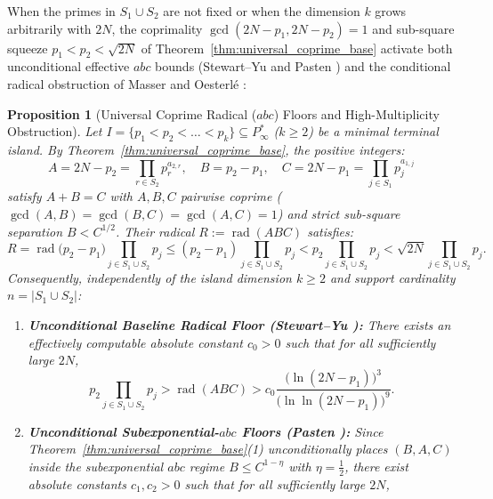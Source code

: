 \documentclass[11pt,a4paper]{article}
\newtheorem{proposition}[theorem]{Proposition}
\theoremstyle{definition}
\begin{document}
When the primes in $S_1 \cup S_2$ are not fixed or when the dimension $k$ grows arbitrarily with $2N$, the coprimality $\gcd(2N - p_1, 2N - p_2) = 1$ and sub-square squeeze $p_1 < p_2 < \sqrt{2N}$ of Theorem~\ref{thm:universal_coprime_base} activate both unconditional effective $abc$ bounds (Stewart--Yu \cite{stewartyu2001} and Pasten \cite{pasten2024}) and the conditional radical obstruction of Masser and Oesterl\'e \cite{masser1985, oesterle1988}:

\begin{proposition}[Universal Coprime Radical ($abc$) Floors and High-Multiplicity Obstruction]
\label{prop:abc_universal_collapse}
Let $I = \{p_1 < p_2 < \dots < p_k\} \subseteq P^*_\infty$ ($k \ge 2$) be a minimal terminal island. By Theorem~\ref{thm:universal_coprime_base}, the positive integers:
\[
A = 2N - p_2 = \prod_{r \in S_2} p_r^{a_{2,r}}, \quad B = p_2 - p_1, \quad C = 2N - p_1 = \prod_{j \in S_1} p_j^{a_{1,j}}
\]
satisfy $A + B = C$ with $A, B, C$ pairwise coprime ($\gcd(A, B) = \gcd(B, C) = \gcd(A, C) = 1$) and strict sub-square separation $B < C^{1/2}$. Their radical $R := \operatorname{rad}(ABC)$ satisfies:
\begin{equation}
\label{eq:universal_radical_bound}
R = \operatorname{rad}\bigl(p_2 - p_1\bigr) \prod_{j \in S_1 \cup S_2} p_j \le (p_2 - p_1) \prod_{j \in S_1 \cup S_2} p_j < p_2 \prod_{j \in S_1 \cup S_2} p_j < \sqrt{2N} \prod_{j \in S_1 \cup S_2} p_j.
\end{equation}
Consequently, independently of the island dimension $k \ge 2$ and support cardinality $n = |S_1 \cup S_2|$:
\begin{enumerate}
    \item \textbf{Unconditional Baseline Radical Floor (Stewart--Yu \cite{stewartyu2001}):} There exists an effectively computable absolute constant $c_0 > 0$ such that for all sufficiently large $2N$,
    \begin{equation}
    \label{eq:stewart_yu_floor}
    p_2 \prod_{j \in S_1 \cup S_2} p_j > \operatorname{rad}(ABC) > c_0 \frac{\bigl(\ln(2N - p_1)\bigr)^3}{\bigl(\ln\ln(2N - p_1)\bigr)^9}.
    \end{equation}
    \item \textbf{Unconditional Subexponential-$abc$ Floors (Pasten \cite{pasten2024}):} Since Theorem~\ref{thm:universal_coprime_base}(1) unconditionally places $(B, A, C)$ inside the subexponential $abc$ regime $B \le C^{1 - \eta}$ with $\eta = \frac{1}{2}$, there exist absolute constants $c_1, c_2 > 0$ such that for all sufficiently large $2N$,

\end{enumerate}
\end{proposition}
\end{document}
